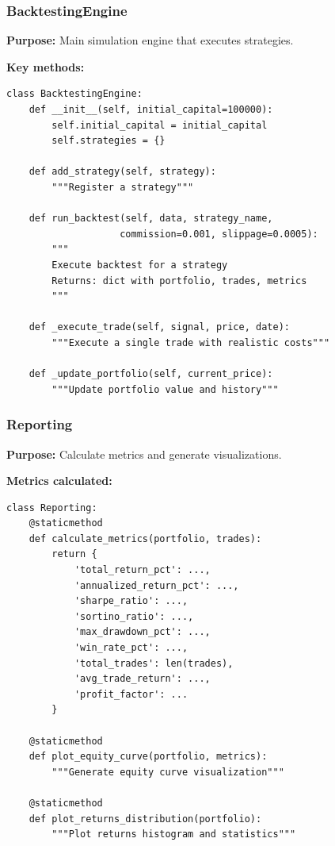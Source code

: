 \documentclass[11pt,a4paper]{article}
\begin{document}
\subsubsection{BacktestingEngine}

\textbf{Purpose:} Main simulation engine that executes strategies.

\textbf{Key methods:}
\begin{lstlisting}[style=pythoncode]
class BacktestingEngine:
    def __init__(self, initial_capital=100000):
        self.initial_capital = initial_capital
        self.strategies = {}
        
    def add_strategy(self, strategy):
        """Register a strategy"""
        
    def run_backtest(self, data, strategy_name, 
                    commission=0.001, slippage=0.0005):
        """
        Execute backtest for a strategy
        Returns: dict with portfolio, trades, metrics
        """
        
    def _execute_trade(self, signal, price, date):
        """Execute a single trade with realistic costs"""
        
    def _update_portfolio(self, current_price):
        """Update portfolio value and history"""
\end{lstlisting}

\subsubsection{Reporting}

\textbf{Purpose:} Calculate metrics and generate visualizations.

\textbf{Metrics calculated:}
\begin{lstlisting}[style=pythoncode]
class Reporting:
    @staticmethod
    def calculate_metrics(portfolio, trades):
        return {
            'total_return_pct': ...,
            'annualized_return_pct': ...,
            'sharpe_ratio': ...,
            'sortino_ratio': ...,
            'max_drawdown_pct': ...,
            'win_rate_pct': ...,
            'total_trades': len(trades),
            'avg_trade_return': ...,
            'profit_factor': ...
        }
    
    @staticmethod
    def plot_equity_curve(portfolio, metrics):
        """Generate equity curve visualization"""
        
    @staticmethod
    def plot_returns_distribution(portfolio):
        """Plot returns histogram and statistics"""
\end{lstlisting}
\end{document}
